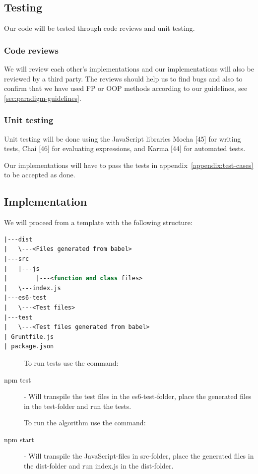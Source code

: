 \documentclass {article}
\begin{document}
\subsection{Testing}
Our code will be tested through code reviews and unit testing.
\subsubsection{Code reviews}
We will review each other's implementations and our implementations will also be reviewed by a third party. The reviews should help us to find bugs and also to confirm that we have used FP or OOP methods according to our guidelines, see \ref{sec:paradigm-guidelines}.
\subsubsection{Unit testing}
Unit testing will be done using the JavaScript libraries Mocha [45] for writing tests, Chai [46] for evaluating expressions, and Karma [44] for automated tests.

Our implementations will have to pass the tests in appendix~\ref{appendix:test-cases} to be accepted as done.
\subsection{Implementation}
We will proceed from a template with the following structure:

\begin{lstlisting}[language=Pascal, deletekeywords={function, and}, numbers=none]
|---dist
|   \---<Files generated from babel>
|---src
|   |---js
|        |---<function and class files>
|   \---index.js
|---es6-test
|   \---<Test files>
|---test
|   \---<Test files generated from babel>
| Gruntfile.js
| package.json
\end{lstlisting}

\begin{description}
\item[] To run tests use the command:
\item[npm test] - Will transpile the test files in the es6-test-folder, place the generated files in the test-folder and run the tests.
\item[] To run the algorithm use the command:
\item[npm start] - Will transpile the JavaScript-files in src-folder, place the generated files in the dist-folder and run index.js in the dist-folder.
\end{description}
\end{document}
